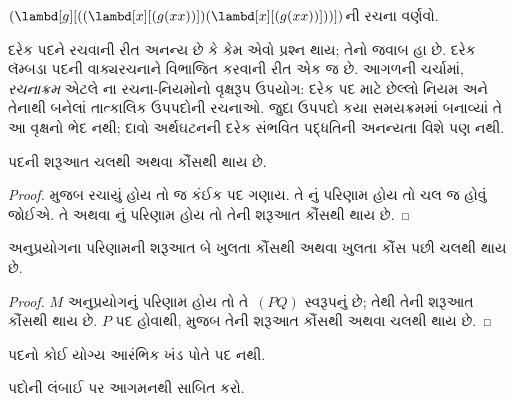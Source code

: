 \begin{prob}
$(\lambd[g][((\lambd[x][(g (x x))])
  (\lambd[x][(g (x x))]))])$ની રચના વર્ણવો.
\end{prob}
\endgroup


\begingroup
\makeatletter{}\makeatother

\label{guunit:OLP-0358}


દરેક પદને રચવાની રીત અનન્ય છે કે કેમ એવો પ્રશ્ન થાય; તેનો
જવાબ હા છે. દરેક લૅમ્બડા પદની વાક્યરચનાને વિભાજિત કરવાની
રીત એક જ છે. આગળની ચર્ચામાં, \emph{રચનાક્રમ} એટલે
ના રચના-નિયમોનો વૃક્ષરૂપ ઉપયોગ:
દરેક પદ માટે છેલ્લો નિયમ અને તેનાથી બનેલાં તાત્કાલિક ઉપપદોની
રચનાઓ. જુદા ઉપપદો કયા સમયક્રમમાં બનાવ્યાં તે આ વૃક્ષનો ભેદ નથી;
દાવો અર્થઘટનની દરેક સંભવિત પદ્ધતિની અનન્યતા વિશે પણ નથી.

\begin{lem}
પદની શરૂઆત ચલથી અથવા કૌંસથી થાય છે.
\end{lem}

\begin{proof}
 મુજબ રચાયું હોય તો જ કંઈક પદ ગણાય.
તે નું પરિણામ હોય તો ચલ જ હોવું જોઈએ.
તે  અથવા
નું પરિણામ હોય તો તેની શરૂઆત કૌંસથી
થાય છે.
\end{proof}

\begin{lem}
અનુપ્રયોગના પરિણામની શરૂઆત બે ખુલતા કૌંસથી અથવા ખુલતા કૌંસ
પછી ચલથી થાય છે.
\end{lem}

\begin{proof}
$M$ અનુપ્રયોગનું પરિણામ હોય તો તે~$(PQ)$ સ્વરૂપનું છે;
તેથી તેની શરૂઆત કૌંસથી થાય છે. $P$ પદ હોવાથી,
 મુજબ તેની શરૂઆત કૌંસથી અથવા ચલથી
થાય છે.
\end{proof}

\begin{lem}
પદનો કોઈ યોગ્ય આરંભિક ખંડ પોતે પદ નથી.
\end{lem}

\begin{prob}
પદોની લંબાઈ પર આગમનથી
 સાબિત કરો.
\end{prob}


